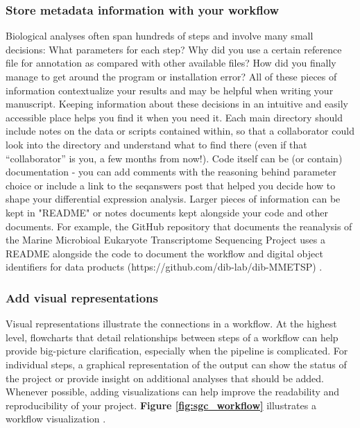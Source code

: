 \documentclass[10pt,letterpaper]{article}
\begin{document}
\subsubsection*{Store metadata information with your workflow} 
Biological analyses often span hundreds of steps and involve many small decisions: What parameters for each step? 
Why did you use a certain reference file for annotation as compared with other available files? 
How did you finally manage to get around the program or installation error? 
All of these pieces of information contextualize your results and may be helpful when writing your manuscript. 
Keeping information about these decisions in an intuitive and easily accessible place helps you find it when you need it. 
Each main directory should include notes on the data or scripts contained within, so that a collaborator could look into the directory and understand what to find there (even if that “collaborator” is you, a few months from now!). 
Code itself can be (or contain) documentation - you can add comments with the reasoning behind parameter choice or include a link to the seqanswers post that helped you decide how to shape your differential expression analysis. 
Larger pieces of information can be kept in "README" or notes documents kept alongside your code and other documents. 
For example, the GitHub repository that documents the reanalysis of the Marine Microbioal Eukaryote Transcriptome Sequencing Project uses a README alongside the code to document the workflow and digital object identifiers for data products (https://github.com/dib-lab/dib-MMETSP) \cite{johnson2019}.   

\subsubsection*{Add visual representations} 
Visual representations illustrate the connections in a workflow. 
At the highest level, flowcharts that detail relationships between steps of a workflow can help provide big-picture clarification, especially when the pipeline is complicated. 
For individual steps, a graphical representation of the output can show the status of the project or provide insight on additional analyses that should be added. 
Whenever possible, adding visualizations can help improve the readability and reproducibility of your project. \textbf{Figure \ref{fig:sgc_workflow}} illustrates a workflow visualization \cite{brown2019exploring}. 
\end{document}
